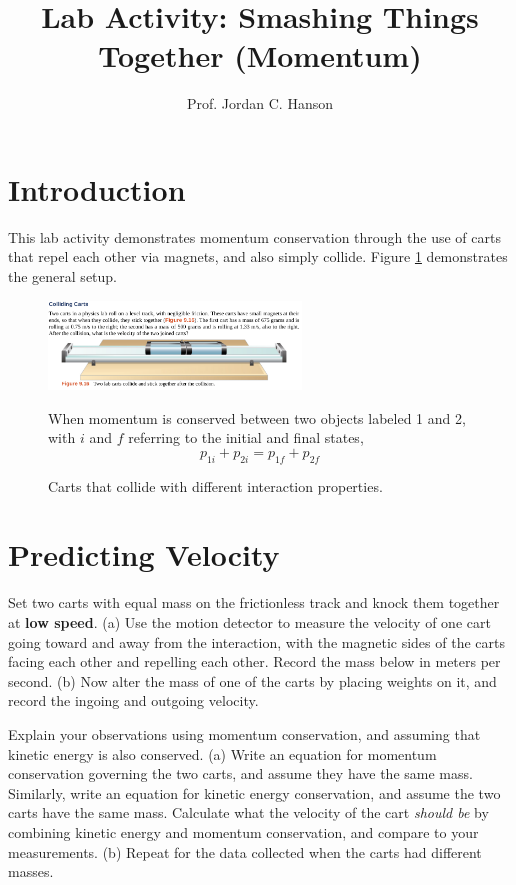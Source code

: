 \documentclass{article}
\begin{document}
\title{Lab Activity: Smashing Things Together (Momentum)}
\author{Prof. Jordan C. Hanson}

\maketitle

\section{Introduction}
This lab activity demonstrates momentum conservation through the use of carts that repel each other via magnets, and also simply collide.  Figure \ref{fig:carts} demonstrates the general setup.
\begin{figure}[ht]
\centering
\includegraphics[width=0.6\textwidth]{figures/carts.png}
\caption{\label{fig:carts} Carts that collide with different interaction properties.}
When momentum is conserved between two objects labeled 1 and 2, with $i$ and $f$ referring to the initial and final states,
\begin{equation}
p_{1i} + p_{2i} = p_{1f} + p_{2f}
\end{equation}
\end{figure}

\section{Predicting Velocity}

Set two carts with equal mass on the frictionless track and knock them together at \textbf{low speed}.  (a) Use the motion detector to measure the velocity of one cart going toward and away from the interaction, with the magnetic sides of the carts facing each other and repelling each other.  Record the mass below in meters per second.  (b) Now alter the mass of one of the carts by placing weights on it, and record the ingoing and outgoing velocity.  \\ \vspace{1.5cm}

Explain your observations using momentum conservation, and assuming that kinetic energy is also conserved.  (a) Write an equation for momentum conservation governing the two carts, and assume they have the same mass.  Similarly, write an equation for kinetic energy conservation, and assume the two carts have the same mass.  Calculate what the velocity of the cart \textit{should be} by combining kinetic energy and momentum conservation, and compare to your measurements.  (b) Repeat for the data collected when the carts had different masses.
\end{document}
